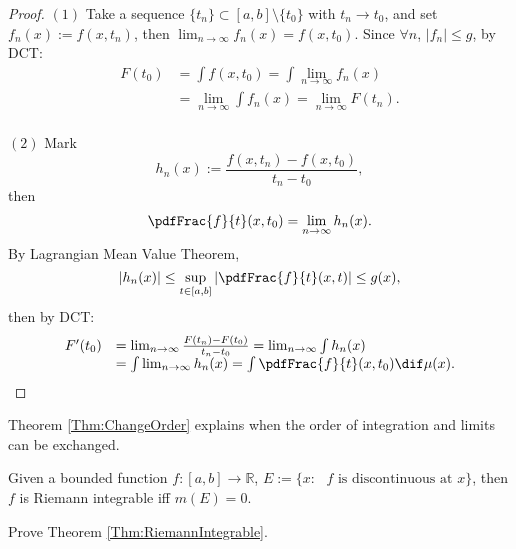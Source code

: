 \begin{proof}
    $(1)$ Take a sequence $\{t_{n}\}\subset[a,b]\setminus\{t_0\}$ 
    with $t_{n}\rightarrow t_0$, and set $f_{n}(x):=f(x,t_{n})$, 
    then $\lim_{n\rightarrow\infty}f_{n}(x)=f(x,t_{0})$. 
    Since $\forall n$, $|f_{n}|\le g$, by DCT:
    \begin{displaymath}
        \begin{array}{rl}
        F(t_0)
        &=\int f(x,t_{0})=\int\lim_{n\rightarrow\infty}f_{n}(x)\\
        &=\lim_{n\rightarrow\infty}\int f_{n}(x)
        =\lim_{n\rightarrow\infty}F(t_{n}).\\
        \end{array}
    \end{displaymath}

    $(2)$ Mark 
    \begin{displaymath}
        h_{n}(x):=\frac{f(x,t_n)-f(x,t_0)}{t_n-t_0},
    \end{displaymath}
    then 
    \begin{displaymath}
        \pdfFrac{f}{t}(x,t_0)=\lim_{n\rightarrow\infty}h_{n}(x).
    \end{displaymath}
    By Lagrangian Mean Value Theorem, 
    \begin{displaymath}
        |h_{n}(x)|\le\sup_{t\in[a,b]}
        \left|\pdfFrac{f}{t}(x,t)\right|\le g(x),
    \end{displaymath}
    then by DCT: 
    \begin{displaymath}
        \begin{array}{rl}
        F'(t_0)&=\lim_{n\rightarrow\infty}\frac{F(t_n)-F(t_0)}{t_n-t_0}
        =\lim_{n\rightarrow\infty}\int h_n(x)\\
        &=\int\lim_{n\rightarrow\infty}h_{n}(x)
        =\int\pdfFrac{f}{t}(x,t_0)\dif\mu(x).
        \end{array}
    \end{displaymath}
\end{proof}
\begin{rem}
    Theorem \ref{Thm:ChangeOrder} 
    explains when the order of integration and limits can be exchanged.
\end{rem}
\begin{thm}
    \label{Thm:RiemannIntegrable}
    Given a bounded function $f:[a,b]\rightarrow\mathbb{R}$, 
    $E:=\{x:\text{ }f\text{ is discontinuous at }x\}$,
    then $f$ is Riemann integrable iff $m(E)=0$. 
\end{thm}
\begin{exc}
    Prove Theorem \ref{Thm:RiemannIntegrable}.
\end{exc}

